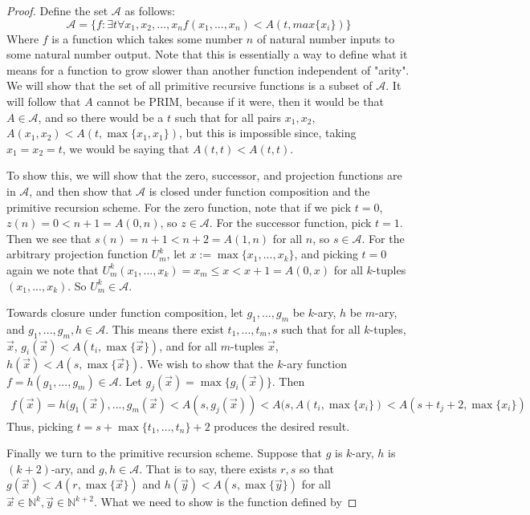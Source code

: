 \documentclass{article}
\theoremstyle{definition}
\theoremstyle{plain}
\theoremstyle{theorem}
\begin{document}
\begin{proof}
    Define the set $\mathcal{A}$ as follows:
    \[ \mathcal{A} = \{f: \exists t \forall x_1,x_2,...,x_n f(x_1,...,x_n) < A(t,max\{x_i\})\} \]
    Where $f$ is a function which takes some number $n$ of natural number inputs to some natural number output. Note that this is essentially a way to define what it means for a function to grow slower than another function independent of "arity". We will show that the set of all primitive recursive functions is a subset of $\mathcal{A}$. It will follow that $A$ cannot be PRIM, because if it were, then it would be that $A \in \mathcal{A}$, and so there would be a $t$ such that for all pairs $x_1,x_2$, $A(x_1,x_2) < A(t,\max\{x_1,x_1\})$, but this is impossible since, taking $x_1=x_2=t$, we would be saying that $A(t,t)<A(t,t)$.
    \par To show this, we will show that the zero, successor, and projection functions are in $\mathcal{A}$, and then show that $\mathcal{A}$ is closed under function composition and the primitive recursion scheme. For the zero function, note that if we pick $t=0$, $z(n) = 0 < n+1 = A(0,n)$, so $z \in \mathcal{A}$. For the successor function, pick $t=1$. Then we see that $s(n) = n+1 < n+2 = A(1,n)$ for all $n$, so $s \in \mathcal{A}$. For the arbitrary projection function $U_m^k$, let $x := \max\{x_1,...,x_k\}$, and picking $t=0$ again we note that $U_m^k(x_1,...,x_k) = x_m \leq x < x+1 = A(0,x)$ for all $k$-tuples  $(x_1,...,x_k)$. So $U_m^k \in \mathcal{A}$.
    \par Towards closure under function composition, let $g_1,...,g_m$ be $k$-ary, $h$ be $m$-ary, and $g_1,...,g_m,h \in \mathcal{A}$. This means there exist $t_1,...,t_m,s$ such that for all $k$-tuples, $\vec{x}$, $g_i(\vec{x}) < A(t_i,\max\{\vec{x}\})$, and for all $m$-tuples $\vec{x}$, $h(\vec{x}) < A(s,\max\{\vec{x}\})$. We wish to show that the $k$-ary function $f = h(g_1,...,g_m) \in \mathcal{A}$. Let $g_j(\vec{x}) = \max\{g_i(\vec{x})\}$. Then
    \begin{align}
        f(\vec{x}) = h(g_1(\vec{x}),...,g_m(\vec{x}) < A(s,g_j(\vec{x})) < A(s,A(t_i,\max\{x_i\}) < A(s+t_j+2,\max\{x_i\})
    \end{align}
    Thus, picking $t = s+\max\{t_1,...,t_n\}+2$ produces the desired result.
    \par Finally we turn to the primitive recursion scheme. Suppose that $g$ is $k$-ary, $h$ is $(k+2)$-ary, and $g,h \in \mathcal{A}$. That is to say, there exists $r,s$ so that $g(\vec{x}) < A(r,\max\{\vec{x}\})$ and $h(\vec{y}) < A(s,\max\{\vec{y}\})$ for all $\vec{x} \in \mathbb{N}^k,\vec{y} \in \mathbb{N}^{k+2}$. What we need to show is the function defined by 

\end{proof}
\end{document}
